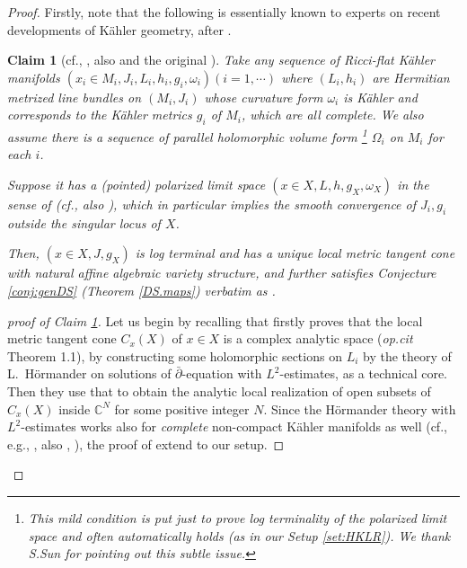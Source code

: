 \documentclass[12pt,a4paper]{amsart}
\newtheorem{Claim}[Thm]{Claim}
\theoremstyle{remark}
\theoremstyle{definition}
\def\C{\mathbb{C}}
\begin{document}
\begin{proof}

Firstly, note that 
the following is essentially known to experts 
on recent developments of K\"ahler geometry, after \cite{DSII}. 

\begin{Claim}[cf., {\cite[\S 3.1]{Uniqueness}, also \cite{Zha24} and the  original \cite{DSII}}]\label{completeDSII}
Take any sequence of Ricci-flat K\"ahler manifolds $(x_i\in  M_i,J_i,L_i,h_i,g_i,\omega_i) (i=1,\cdots)$ where $(L_i,h_i)$ are 
Hermitian metrized line bundles on $(M_i,J_i)$ 
whose curvature form $\omega_i$ 
is K\"ahler and corresponds to the K\"ahler metrics $g_i$ of $M_i$, 
which are all {\it complete}. 
We also assume there is a sequence of parallel holomorphic volume form
\footnote{This mild condition is put just to prove 
log terminality of the polarized limit space and often automatically holds 
(as in our Setup \ref{set:HKLR}). 
We thank S.Sun for pointing out this subtle issue.}
$\Omega_i$ on $M_i$ for each $i$. 

Suppose it has a (pointed) polarized limit space 
$(x\in X,L,h,g_X,\omega_X)$
in the sense of 
\cite[\S 2.1]{DSII} (cf., also \cite{DS}), which in particular implies 
the smooth convergence of 
$J_i, g_i$ outside the singular locus of $X$. 

Then, 
$(x\in X,J,g_X)$ is log terminal and  has a unique local metric tangent 
cone 
with natural affine algebraic variety structure, and further 
satisfies Conjecture \ref{conj:genDS} (Theorem \ref{DS.maps}) 
verbatim as \cite{DSII}. 
\end{Claim}

\begin{proof}[proof of Claim \ref{completeDSII}]
Let us begin by recalling that \cite{DSII} firstly proves that the local metric tangent cone $C_x(X)$ of $x\in X$ 
is a complex analytic space ({\it op.cit} Theorem 1.1), by constructing some holomorphic sections on $L_i$ by the theory of L.~H\"ormander on solutions of $\bar{\partial}$-equation with $L^2$-estimates, as a technical core. Then they use  that to obtain the analytic local 
realization of open subsets of $C_x(X)$ 
inside $\C^N$ for some positive integer $N$. 
Since the H\"ormander theory with $L^2$-estimates works also for 
{\it complete} non-compact K\"ahler manifolds as well (cf., e.g., \cite[Chap 
VIII \S  4 Theorem 4.5 (p.370)]{DemaillyAGbook}, 
also \cite{Uniqueness}, \cite{Zha24}), 
the proof of \cite[Theorem 1.1]{DSII} extend to our setup. 


\end{proof}
\end{proof}
\end{document}
